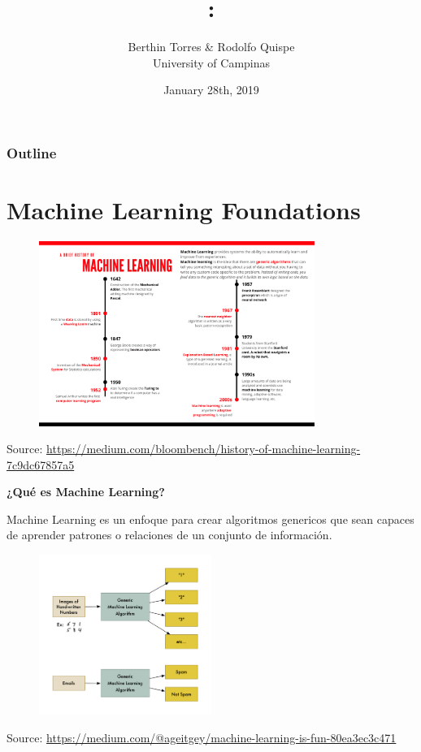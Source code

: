 \documentclass[english,svgnames,notes=hide,12pt]{beamer}
\title{\large\seminarname:\\\large\presentationtitle}
\author{Berthin Torres \& Rodolfo Quispe\\
    \small University of Campinas
}
\date{January 28th, 2019}
\begin{document}
\thispagestyle{empty}
\begin{frame}
    \titlepage
\end{frame}

\begin{frame}
    \frametitle{Outline}
    \tableofcontents
\end{frame}


\section{Machine Learning Foundations}
\begin{frame}
    \begin{figure}
        \includegraphics[width=0.8\textwidth]{imgs/machine-learning-timeline.pdf}
    \end{figure}
    \centering\tiny{Source: \url{https://medium.com/bloombench/history-of-machine-learning-7c9dc67857a5}}
\end{frame}

\begin{frame}
    \textbf{¿Qué es Machine Learning?}
    
    Machine Learning es un enfoque para crear algoritmos genericos que sean capaces de aprender patrones o relaciones de un conjunto de informaci\'on.
    \vspace{-1cm}

    \begin{figure}
        \includegraphics[width=0.5\textwidth]{imgs/sample-ml.png}
    \end{figure}
    \vspace{-.5cm}
    \centering\tiny{Source: \url{https://medium.com/@ageitgey/machine-learning-is-fun-80ea3ec3c471}}
\end{frame}
\end{document}
